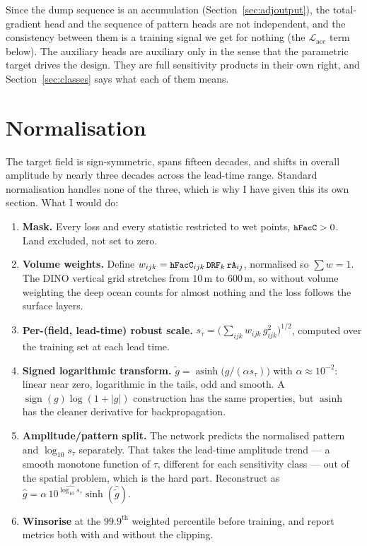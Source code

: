 Since the dump sequence is an accumulation
(Section~\ref{sec:adjoutput}), the total-gradient head
and the sequence of pattern heads are not independent, and the consistency
between them is a training signal we get for nothing (the
$\mathcal{L}_{\text{acc}}$ term below). The auxiliary heads are auxiliary only
in the sense that the parametric target drives the design. They are full
sensitivity products in their own right, and Section~\ref{sec:classes} says
what each of them means.

\section{Normalisation}
\label{sec:norm}

The target field is sign-symmetric, spans fifteen decades, and shifts in
overall amplitude by nearly three decades across the lead-time range. Standard
normalisation handles none of the three, which is why I have given this its own
section. What I would do:

\begin{enumerate}
  \item \textbf{Mask.} Every loss and every statistic restricted to wet points,
        $\texttt{\small hFacC}>0$. Land excluded, not set to zero.
  \item \textbf{Volume weights.} Define
        $w_{ijk} = \texttt{\small hFacC}_{ijk}\,\texttt{\small DRF}_k\,\texttt{\small rA}_{ij}$, normalised
        so $\sum w = 1$. The DINO vertical grid stretches from $10\,\mathrm{m}$
        to $600\,\mathrm{m}$, so without volume weighting the deep ocean counts
        for almost nothing and the loss follows the surface layers.
  \item \textbf{Per-(field, lead-time) robust scale.}
        $s_\tau = \big(\sum_{ijk} w_{ijk}\,g_{ijk}^{2}\big)^{1/2}$, computed
        over the training set at each lead time.
  \item \textbf{Signed logarithmic transform.}
        $\tilde{g} = \operatorname{asinh}\!\big(g/(\alpha s_\tau)\big)$ with
        $\alpha\approx10^{-2}$: linear near zero, logarithmic in the tails, odd
        and smooth. A $\operatorname{sign}(g)\log(1+|g|)$ construction has the
        same properties, but $\operatorname{asinh}$ has the cleaner derivative
        for backpropagation.
  \item \textbf{Amplitude/pattern split.} The network predicts the normalised
        pattern and $\log_{10}s_\tau$ separately. That takes the lead-time
        amplitude trend --- a smooth monotone function of $\tau$, different for
        each sensitivity class --- out of the spatial problem, which is the hard
        part. Reconstruct as
        $\hat{g} = \alpha\,10^{\widehat{\log_{10}s_\tau}}\sinh(\hat{\tilde{g}})$.
  \item \textbf{Winsorise} at the $99.9^{\text{th}}$ weighted percentile before
        training, and report metrics both with and without the clipping.
\end{enumerate}

